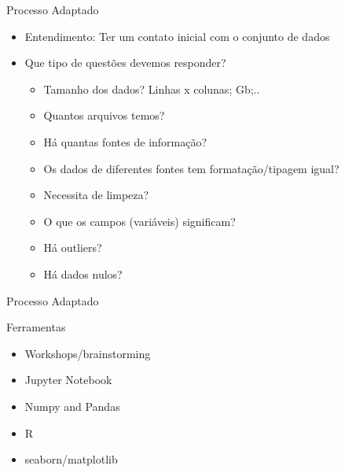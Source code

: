 \begin{frame}
	\begin{block}{Processo Adaptado}
		\begin{itemize}
		\item Entendimento: Ter um contato inicial com o conjunto de dados
		\item Que tipo de questões devemos responder?
			\begin{itemize}
				\item Tamanho dos dados? Linhas x colunas; Gb;..
				\item Quantos arquivos temos?
				\item Há quantas fontes de informação?
				\item Os dados de diferentes fontes tem formatação/tipagem igual?
				\item Necessita de limpeza?
				\item O que os campos (variáveis) significam?
				\item Há outliers?
				\item Há dados nulos?
			\end{itemize}
				
		\end{itemize}
	\end{block}
\end{frame}


\begin{frame}
	\begin{block}{Processo Adaptado}
	
		Ferramentas
		\begin{itemize}
			\item Workshops/brainstorming
			\item Jupyter Notebook
			\item Numpy and Pandas
			\item R
			\item seaborn/matplotlib
		\end{itemize}
	\end{block}
\end{frame}



